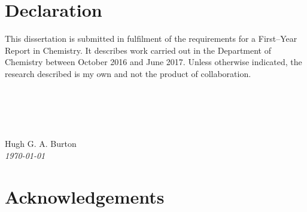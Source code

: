 \documentclass[a4paper,12pt,openright,oneside]{article}
\theoremstyle{plain}
\numberwithin{equation}{subsection}
\begin{document}
\cleardoublepage

\cleardoublepage
{}
\thispagestyle{empty}
\cleardoublepage
\section*{Declaration}

This dissertation is submitted in fulfilment of the requirements for a First--Year Report in Chemistry. It describes work carried out in the Department of Chemistry between October 2016 and June 2017. Unless otherwise indicated, the research described is my own and not the product of collaboration.
\\
\\
\\
\\
\\
\\
Hugh G. A. Burton\\
\textit{\today}
\section*{Acknowledgements}

\newpage

\cleardoublepage

\newpage

\tableofcontents


\newpage
\cleardoublepage
\renewcommand\thepart{\arabic{part}}
\fancyhead{}
\rhead{\thepage}
\lhead{\leftmark}
\lfoot[]{}
\rfoot[]{}
\cfoot[]{}
\pagestyle{fancy}

\newpage

\newpage
\thispagestyle{plain}





\newpage

\newpage
\begin{appendices}

\end{appendices}



\newpage
\thispagestyle{plain}

\newpage
\cleardoublepage
\end{document}
